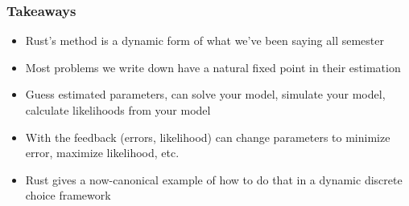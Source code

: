 \documentclass{beamer}
\begin{document}
\begin{frame}
\frametitle{Takeaways}
\begin{itemize}
\item Rust's method is a dynamic form of what we've been saying all semester
\bigskip
\item Most problems we write down have a natural fixed point in their estimation
\bigskip
\item Guess estimated parameters, can solve your model, simulate your model, calculate likelihoods from your model
\bigskip
\item With the feedback (errors, likelihood) can change parameters to minimize error, maximize likelihood, etc.
\bigskip
\item Rust gives a now-canonical example of how to do that in a dynamic discrete choice framework 
\end{itemize}
\end{frame}
\end{document}
